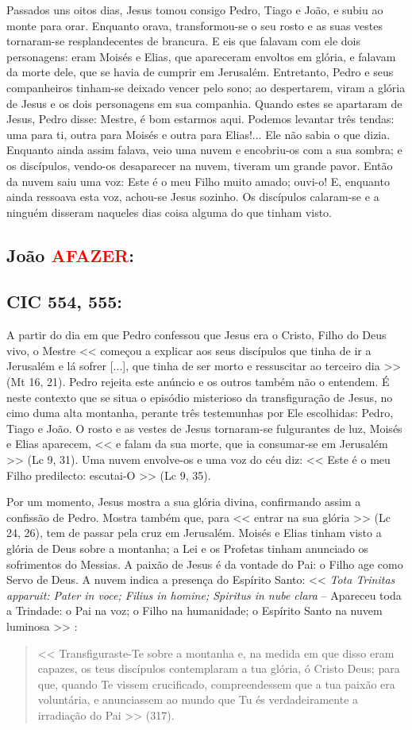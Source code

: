 \documentclass[10pt,a5paper]{book}
\newcommand{\from}[1]{\subsection*{#1}}
\newcommand{\TODO}{\textcolor{red}{\ttfamily AFAZER}}
\begin{document}
Passados uns oitos dias, Jesus tomou consigo Pedro, Tiago e João, e subiu ao monte para orar.
Enquanto orava, transformou-se o seu rosto e as suas vestes tornaram-se resplandecentes de brancura.
E eis que falavam com ele dois personagens:
eram Moisés e Elias,
que apareceram envoltos em glória, e falavam da morte dele, que se havia de cumprir em Jerusalém.
Entretanto, Pedro e seus companheiros tinham-se deixado vencer pelo sono;
ao despertarem, viram a glória de Jesus e os dois personagens em sua companhia.
Quando estes se apartaram de Jesus, Pedro disse:
Mestre, é bom estarmos aqui.
Podemos levantar três tendas:
uma para ti, outra para Moisés e outra para Elias!...
Ele não sabia o que dizia.
Enquanto ainda assim falava, veio uma nuvem e encobriu-os com a sua sombra;
e os discípulos, vendo-os desaparecer na nuvem, tiveram um grande pavor.
Então da nuvem saiu uma voz:
Este é o meu Filho muito amado; ouvi-o!
E, enquanto ainda ressoava esta voz, achou-se Jesus sozinho.
Os discípulos calaram-se e a ninguém disseram naqueles dias coisa alguma do que tinham visto.

\from{João \TODO:}

\from{CIC 554, 555:}

A partir do dia em que Pedro confessou que Jesus era o Cristo, Filho do Deus vivo, o Mestre << começou a explicar aos seus discípulos que tinha de ir a Jerusalém e lá sofrer [...], que tinha de ser morto e ressuscitar ao terceiro dia >> (Mt 16, 21).
Pedro rejeita este anúncio e os outros também não o entendem.
É neste contexto que se situa o episódio misterioso da transfiguração de Jesus, no cimo duma alta montanha, perante três testemunhas por Ele escolhidas:
Pedro, Tiago e João.
O rosto e as vestes de Jesus tornaram-se fulgurantes de luz, Moisés e Elias aparecem, << e falam da sua morte, que ia consumar-se em Jerusalém >> (Lc 9, 31).
Uma nuvem envolve-os e uma voz do céu diz:
<< Este é o meu Filho predilecto: escutai-O >> (Lc 9, 35).

Por um momento, Jesus mostra a sua glória divina, confirmando assim a confissão de Pedro.
Mostra também que, para << entrar na sua glória >> (Lc 24, 26), tem de passar pela cruz em Jerusalém.
Moisés e Elias tinham visto a glória de Deus sobre a montanha;
a Lei e os Profetas tinham anunciado os sofrimentos do Messias.
A paixão de Jesus é da vontade do Pai:
o Filho age como Servo de Deus.
A nuvem indica a presença do Espírito Santo:
<< \emph{Tota Trinitas apparuit: Pater in voce; Filius in homine; Spiritus in nube clara} -- Apareceu toda a Trindade:
o Pai na voz; o Filho na humanidade; o Espírito Santo na nuvem luminosa >> :
\begin{quote}
<< Transfiguraste-Te sobre a montanha e, na medida em que disso eram capazes, os teus discípulos contemplaram a tua glória, ó Cristo Deus;
para que, quando Te vissem crucificado, compreendessem que a tua paixão era voluntária, e anunciassem ao mundo que Tu és verdadeiramente a irradiação do Pai >> (317).
\end{quote}
\end{document}

